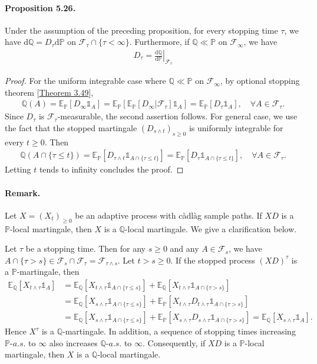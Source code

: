 \documentclass{article}
\numberwithin{equation}{section}
\newcommand{\E}{\mathbb{E}}
\renewcommand{\P}{\mathbb{P}}
\newcommand{\bbP}{\mathbb{P}}
\newcommand{\bbQ}{\mathbb{Q}}
\renewcommand{\d}{\mathrm{d}}
\theoremstyle{plain}
\theoremstyle{definition}
\begin{document}
\paragraph{Proposition 5.26.\label{prop:5.26}} Under the assumption of the preceding proposition, for every stopping time $\tau$, we have $\d\bbQ = D_\tau\d\bbP$ on $\mathscr{F}_\tau\cap\{\tau<\infty\}$. Furthermore, if $\bbQ\ll\bbP$ on $\mathscr{F}_\infty$, we have 
\begin{align*}
	D_\tau = \left.\frac{\d\bbQ}{\d\bbP}\right|_{\mathscr{F}_\tau}
\end{align*}
\begin{proof}
For the uniform integrable case where $\bbQ\ll\bbP$ on $\mathscr{F}_\infty$, by optional stopping theorem [\hyperref[thm:3.49]{Theorem 3.49}],
\begin{align*}
	\bbQ(A)=\E_\bbP[D_\infty\mathds{1}_A]=\E_\bbP\left[\E_\bbP[D_\infty|\mathscr{F}_\tau]\mathds{1}_A\right]=\E_\bbP\left[D_\tau\mathds{1}_A\right],\quad\forall A\in\mathscr{F}_\tau.
\end{align*}
Since $D_\tau$ is $\mathscr{F}_\tau$-measurable, the second assertion follows. For general case, we use the fact that the stopped martingale $(D_{s\wedge t})_{s\geq 0}$ is uniformly integrable for every $t\geq 0$. Then
\begin{align*}
	\bbQ(A\cap\{\tau\leq t\})=\E_\bbP\left[D_{\tau\wedge t}\mathds{1}_{A\cap\{\tau\leq t\}}\right]=\E_\bbP[D_\tau\mathds{1}_{A\cap\{\tau\leq t\}}],\quad\forall A\in\mathscr{F}_{\tau}.
\end{align*}
Letting $t$ tends to infinity concludes the proof. 
\end{proof}
\paragraph{Remark.} Let $X=(X_t)_{\geq 0}$ be an adaptive process with càdlàg sample paths. If $XD$ is a $\P$-local martingale, then $X$ is a $\bbQ$-local martingale. We give a clarification below.

Let $\tau$ be a stopping time. Then for any $s\geq 0$ and any $A\in\mathscr{F}_s$, we have $A\cap\{\tau>s\}\in\mathscr{F}_s\cap\mathscr{F}_\tau=\mathscr{F}_{\tau\wedge s}$.  Let $t>s\geq 0$. If the stopped process $(XD)^\tau$ is a $\bbP$-martingale, then
\begin{align*}
	\E_\bbQ[X_{t\wedge\tau}\mathds{1}_A]&=\E_\bbQ[X_{t\wedge\tau}\mathds{1}_{A\cap\{\tau\leq s\}}]+\E_\bbQ[X_{t\wedge\tau}\mathds{1}_{A\cap\{\tau>s\}}]\\
	&=\E_\bbQ[X_{s\wedge\tau}\mathds{1}_{A\cap\{\tau\leq s\}}]+\E_\bbP[X_{t\wedge\tau}D_{t\wedge\tau}\mathds{1}_{A\cap\{\tau>s\}}]\\
	&=\E_\bbQ[X_{s\wedge\tau}\mathds{1}_{A\cap\{\tau\leq s\}}]+\E_\bbP[X_{s\wedge\tau}D_{s\wedge\tau}\mathds{1}_{A\cap\{\tau>s\}}]=\E_\bbQ[X_{s\wedge\tau}\mathds{1}_A].
\end{align*}
Hence $X^\tau$ is a $\bbQ$-martingale. In addition, a sequence of stopping times increasing $\bbP$-$a.s.$ to $\infty$ also increases $\bbQ$-$a.s.$ to $\infty$. Consequently, if $XD$ is a $\P$-local martingale, then $X$ is a $\bbQ$-local martingale.
\end{document}
